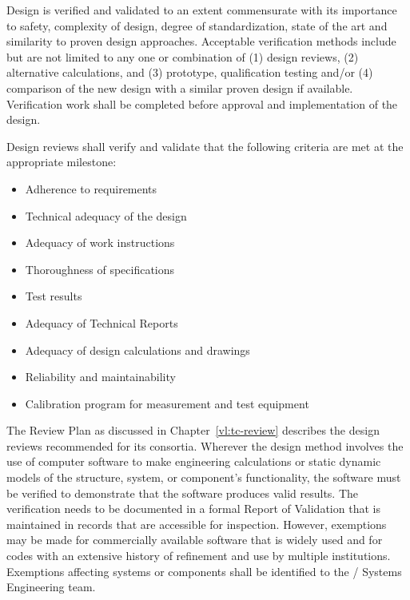 Design is verified and validated to an extent commensurate with its
importance to safety, complexity of design, degree of standardization,
state of the art and similarity to proven design
approaches. Acceptable verification methods include but are not
limited to any one or combination of (1) design reviews, (2)
alternative calculations, and (3) prototype, qualification testing
and/or (4) comparison of the new design with a similar proven design
if available. Verification work shall be completed before approval and
implementation of the design.

Design reviews shall verify and validate that the following criteria
are met at the appropriate milestone:
\begin{itemize}
 \item Adherence to requirements
 \item Technical adequacy of the design
 \item Adequacy of work instructions
 \item Thoroughness of specifications
 \item Test results
 \item Adequacy of Technical Reports
 \item Adequacy of design calculations and drawings
 \item Reliability and maintainability
 \item Calibration program for measurement and test equipment
\end{itemize}

The  Review Plan as discussed in
Chapter~\ref{vl:tc-review} describes the design reviews recommended
for its consortia.  Wherever the design method involves the use of
computer software to make engineering calculations or static dynamic
models of the structure, system, or component's functionality, the
software must be verified to demonstrate that the software produces
valid results. The verification needs to be documented in a formal
Report of Validation that is maintained in records that are accessible
for inspection. However, exemptions may be made for commercially
available software that is widely used and for codes with an extensive
history of refinement and use by multiple institutions. Exemptions
affecting systems or components shall be identified to the
/ Systems Engineering team.

